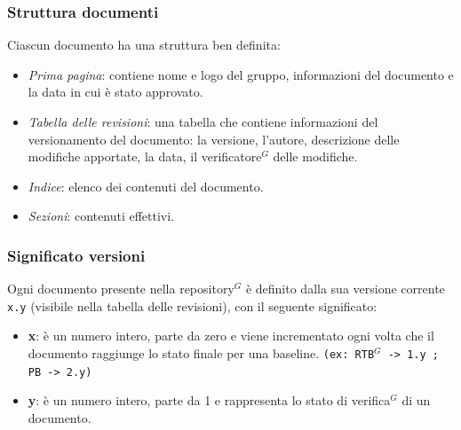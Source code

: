 \documentclass[a4paper,10pt]{article}
\begin{document}
\subsubsection{Struttura documenti}
Ciascun documento ha una struttura ben definita:
\begin{itemize}
  \item \textit{Prima pagina}: contiene nome e logo del gruppo, informazioni del documento e la data in cui è stato approvato.
  \item \textit{Tabella delle revisioni}: una tabella che contiene informazioni del versionamento del documento: la versione,
  l'autore, descrizione delle modifiche apportate, la data, il verificatore$^G$ delle modifiche.
  \item \textit{Indice}: elenco dei contenuti del documento.
  \item \textit{Sezioni}: contenuti effettivi.
\end{itemize}
\subsubsection{Significato versioni}
Ogni documento presente nella repository$^G$ è definito dalla sua versione corrente \texttt{x.y} (visibile nella tabella delle revisioni),
con il seguente significato:
\begin{itemize}
  \item \textbf{x}: è un numero intero, parte da zero e viene incrementato ogni volta che il documento raggiunge lo stato finale per una baseline.
    \texttt{(ex: RTB$^G$ -> 1.y ; PB -> 2.y)}
  \item \textbf{y}: è un numero intero, parte da 1 e rappresenta lo stato di verifica$^G$ di un documento.
\end{itemize}
\end{document}
